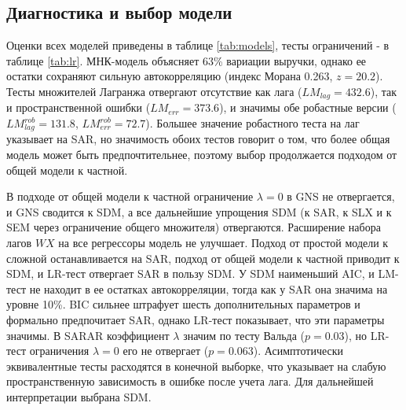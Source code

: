 \documentclass[12pt, a4paper]{article}
\begin{document}
\subsection*{Диагностика и выбор модели}

Оценки всех моделей приведены в таблице \ref{tab:models}, тесты ограничений - в таблице
\ref{tab:lr}. МНК-модель объясняет 63\% вариации выручки, однако ее остатки сохраняют сильную
автокорреляцию (индекс Морана 0.263, $z = 20.2$). Тесты множителей Лагранжа отвергают отсутствие
как лага ($LM_{lag} = 432.6$), так и пространственной ошибки ($LM_{err} = 373.6$), и значимы обе
робастные версии ($LM^{rob}_{lag} = 131.8$, $LM^{rob}_{err} = 72.7$). Большее значение робастного
теста на лаг указывает на SAR, но значимость обоих тестов говорит о том, что более общая модель
может быть предпочтительнее, поэтому выбор продолжается подходом от общей модели к частной.

В подходе от общей модели к частной ограничение $\lambda = 0$ в GNS не отвергается, и GNS
сводится к SDM, а все дальнейшие упрощения SDM (к SAR, к SLX и к SEM через ограничение общего
множителя) отвергаются. Расширение набора лагов $WX$ на все регрессоры модель не улучшает. Подход
от простой модели к сложной останавливается на SAR, подход от общей модели к частной приводит к
SDM, и LR-тест отвергает SAR в пользу SDM. У SDM наименьший AIC, и LM-тест не находит в ее
остатках автокорреляции, тогда как у SAR она значима на уровне 10\%. BIC сильнее штрафует шесть
дополнительных параметров и формально предпочитает SAR, однако LR-тест показывает, что эти
параметры значимы. В SARAR коэффициент $\lambda$ значим по тесту Вальда ($p = 0.03$), но LR-тест
ограничения $\lambda = 0$ его не отвергает ($p = 0.063$). Асимптотически эквивалентные тесты
расходятся в конечной выборке, что указывает на слабую пространственную зависимость в ошибке после
учета лага. Для дальнейшей интерпретации выбрана SDM.
\end{document}
